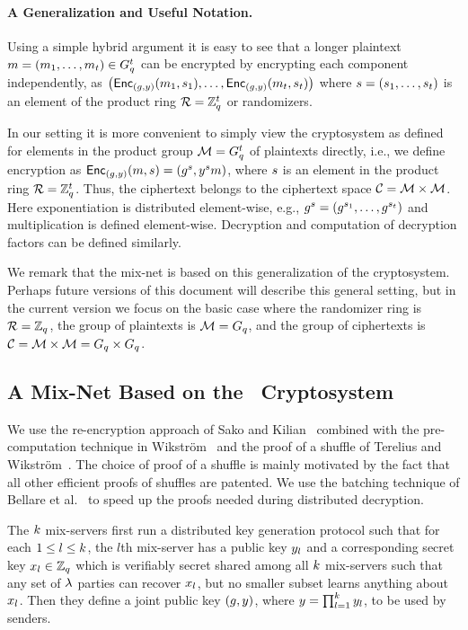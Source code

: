 \documentclass[11pt]{article}
\begin{document}
\paragraph{A Generalization and Useful Notation.}

Using a simple hybrid argument it is easy to see that a longer
plaintext $m=(m_{1},\ldots,m_{t})\in G_{q}^t$ can be
encrypted by encrypting each component independently, as
$\big(\textsf{Enc}_{(g,y)}(m_{1},s_{1}),\ldots,\textsf{Enc}_{(g,y)}(m_{t},s_{t})\big)$
where $s=(s_{1},\ldots,s_{t})$ is an element of the
product ring $\mathcal{R}=\mathbb{Z}_{q}^t$ or randomizers.

In our setting it is more convenient to simply view the cryptosystem
as defined for elements in the product group $\mathcal{M}=G_{q}^t$ of
plaintexts directly, i.e., we define encryption as
$\textsf{Enc}_{(g,y)}(m,s)=(g^{s},y^{s}m)$, where
$s$ is an element in the product ring $\mathcal{R}=\mathbb{Z}_{q}^t$. Thus, the
ciphertext belongs to the ciphertext space
$\mathcal{C}=\mathcal{M}\times\mathcal{M}$. Here exponentiation is distributed
element-wise, e.g.,
$g^{s}=(g^{s_{1}},\ldots,g^{s_{t}})$ and multiplication
is defined element-wise. Decryption and computation of decryption
factors can be defined similarly.

We remark that the \veri mix-net is based on this generalization of
the \elgamal cryptosystem. Perhaps future versions of this document
will describe this general setting, but in the current version we
focus on the basic case where the randomizer ring is $\mathcal{R}=\mathbb{Z}_{q}$,
the group of plaintexts is $\mathcal{M}=G_{q}$, and the group of ciphertexts
is $\mathcal{C}=\mathcal{M}\times\mathcal{M}=G_{q}\times G_{q}$.


\subsection{A Mix-Net Based on the \elgamal~Cryptosystem}\label{sect:mixnet}

We use the re-encryption approach of Sako and Kilian~\cite{saki}
combined with the pre-computation technique in
Wikstr{\"o}m~\cite{wik09b} and the proof of a shuffle of Terelius and
Wikstr{\"o}m~\cite{TW10}. The choice of proof of a shuffle is mainly
motivated by the fact that all other efficient proofs of shuffles are
patented. We use the batching technique of Bellare et
al.~\cite{BeGaRa} to speed up the proofs needed during distributed
decryption.

The $k$ mix-servers first run a distributed key generation protocol
such that for each $1\leq l\leq k$, the $l$th mix-server has a public
key $y_{l}$ and a corresponding secret key $x_{l}\in\mathbb{Z}_{q}$ which is
verifiably secret shared among all $k$ mix-servers such that any set
of $\lambda$ parties can recover $x_{l}$, but no smaller subset learns
anything about $x_{l}$. Then they define a joint public key
$(g,y)$, where $y=\prod_{l=1}^{k}y_{l}$, to be used by senders.
\end{document}

